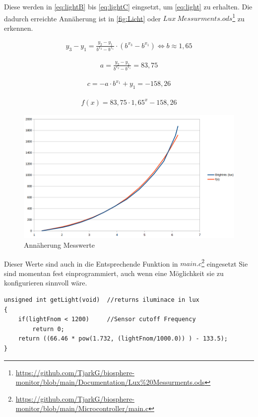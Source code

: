 \documentclass[12pt, a4paper, oneside]{report}
\begin{document}
Diese werden in \autoref{eq:lightB} bis \ref{eq:lightC} eingsetzt, um \autoref{eq:light} zu erhalten. Die dadurch erreichte Annäherung ist in \autoref{fig:Licht} oder $Lux~Messurments.ods$\footnote{\url{https://github.com/TjarkG/biosphere-monitor/blob/main/Documentation/Lux\%20Messurments.ods}} zu erkennen.

\begin{align}
y_3-y_1=\frac{y_2-y_1}{b^{x_2}-b^{x_1}}\cdot(b^{x_3}-b^{x_1}) \iff b \approx 1,65
\label{eq:lightB}
\end{align}

\begin{align}
a=\frac{y_2-y_1}{b^{x_2}-b^{x_1}} = 83,75
\label{eq:lightA}
\end{align}

\begin{align}
c = -a\cdot b^{x_1} + y_1 = -158,26
\label{eq:lightC}
\end{align}

\begin{align}
\label{eq:light}
f(x) = 83,75 \cdot 1,65^x -158,26
\end{align}

\begin{figure}[H]
	\centering
	\includegraphics[width=\textwidth]{pic/Aproximation}
	\caption{Annäherung Messwerte}
	\label{fig:Licht}
\end{figure}
\pagebreak
Dieser Werte sind auch in die Entsprechende Funktion in $main.c$\footnote{\url{https://github.com/TjarkG/biosphere-monitor/blob/main/Microcontroller/main.c}} eingesetzt
Sie sind momentan fest einprogrammiert, auch wenn eine Möglichkeit sie zu konfigurieren sinnvoll wäre.
\begin{lstlisting}
unsigned int getLight(void)  //returns iluminace in lux
{
	if(lightFnom < 1200)     //Sensor cutoff Frequency
		return 0;
	return ((66.46 * pow(1.732, (lightFnom/1000.0)) ) - 133.5);
}
\end{lstlisting}
\end{document}
